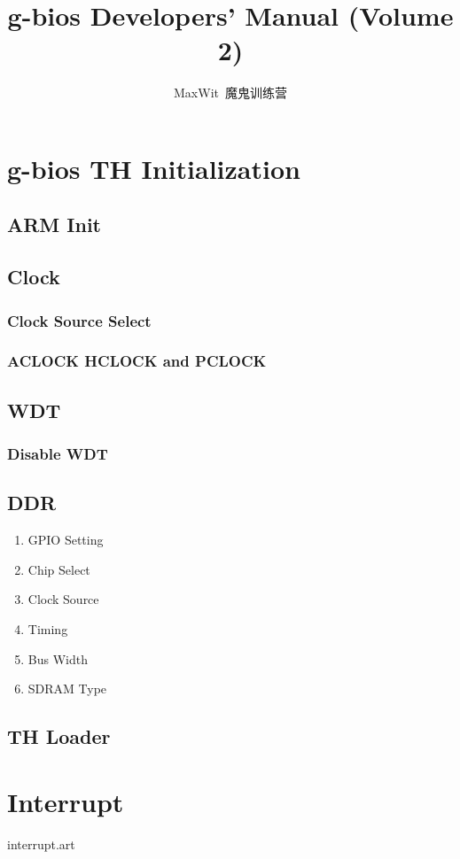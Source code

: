 \documentclass[a4paper,11pt]{book}
\title{g-bios Developers' Manual (Volume 2)}
\author{MaxWit~魔鬼训练营}
\begin{document}
\maketitle
\tableofcontents

\chapter{g-bios TH Initialization}

\section{ARM Init}

\section{Clock}
\subsection{Clock Source Select}
\subsection{ACLOCK HCLOCK and PCLOCK}

\section{WDT}
\subsection{Disable WDT}

\section{DDR}
\begin{enumerate}
\item GPIO Setting
\item Chip Select
\item Clock Source
\item Timing
\item Bus Width
\item SDRAM Type
\end{enumerate}

\section{TH Loader}

\chapter{Interrupt}
 {interrupt.art}
\end{document}
